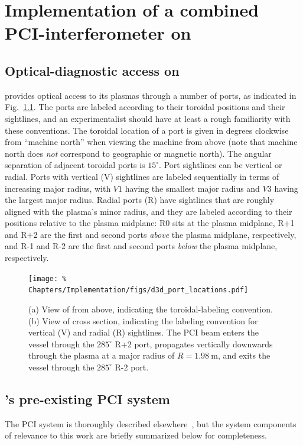 \chapter{Implementation of a combined PCI-interferometer on \diiid}


\section{Optical-diagnostic access on \diiid}
\label{sec:Implementation:d3d_ports}
\diiid \space provides optical access to its plasmas
through a number of ports, as indicated in
Fig.~\ref{fig:Implementation:d3d_port_locations}.
The ports are labeled according to their
toroidal positions and their sightlines, and
an experimentalist should have at least
a rough familiarity with these conventions.
The toroidal location of a port
is given in degrees clockwise from ``machine north''
when viewing the machine from above
(note that machine north does \emph{not} correspond
to geographic or magnetic north).
The angular separation of adjacent toroidal ports is $15^{\circ}$.
Port sightlines can be vertical or radial.
Ports with vertical (V) sightlines
are labeled sequentially in terms of increasing major radius,
with $V1$ having the smallest major radius and
$V3$ having the largest major radius.
Radial ports (R) have sightlines
that are roughly aligned with the plasma's minor radius, and
they are labeled according to their positions
relative to the plasma midplane:
R0 sits at the plasma midplane,
R+1 and R+2 are the first and second ports
\emph{above} the plasma midplane, respectively, and
R-1 and R-2 are the first and second ports
\emph{below} the plasma midplane, respectively.

\begin{figure}
  \centering
  \texttt{[image: \%
    Chapters/Implementation/figs/d3d\_port\_locations.pdf]}
  \caption[\diiid \space port-labeling conventions and location of PCI]{%
    (a) View of \diiid \space from above,
    indicating the toroidal-labeling convention.
    (b) View of \diiid \space cross section,
    indicating the labeling convention
    for vertical (V) and radial (R) sightlines.
    The PCI beam enters the vessel through the $285^{\circ}$ R+2 port,
    propagates vertically downwards through the plasma
    at a major radius of $R = \SI{1.98}{\meter}$, and
    exits the vessel through the $285^{\circ}$ R-2 port.}
\label{fig:Implementation:d3d_port_locations}
\end{figure}


\section{\diiid's pre-existing PCI system}
The \diiid \space PCI system is
thoroughly described elsewhere~\cite{dorris_rsi09, dorris_phd}, but
the system components of relevance to this work
are briefly summarized below for completeness.


